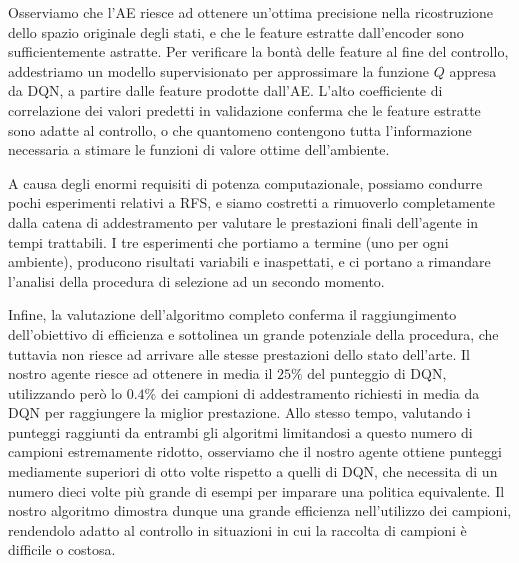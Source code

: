 Osserviamo che l'AE riesce ad ottenere un'ottima precisione nella ricostruzione 
dello spazio originale degli stati, e che le feature estratte dall'encoder 
sono sufficientemente astratte.
Per verificare la bont\`a delle feature al fine del controllo, addestriamo un 
modello supervisionato per approssimare la funzione $Q$ appresa da DQN, a 
partire dalle feature prodotte dall'AE. 
L'alto coefficiente di correlazione dei valori predetti in validazione conferma 
che le feature estratte sono adatte al controllo, o che quantomeno contengono 
tutta l'informazione necessaria a stimare le funzioni di valore ottime 
dell'ambiente. 

A causa degli enormi requisiti di potenza computazionale, possiamo 
condurre pochi esperimenti relativi a RFS, e siamo costretti a rimuoverlo 
completamente dalla catena di addestramento per valutare le prestazioni
finali dell'agente in tempi trattabili. 
I tre esperimenti che portiamo a termine (uno per ogni ambiente), producono 
risultati variabili e inaspettati, e ci portano a rimandare l'analisi della
procedura di selezione ad un secondo momento. 

Infine, la valutazione dell'algoritmo completo conferma il raggiungimento 
dell'obiettivo di efficienza e sottolinea un grande potenziale della procedura,
che tuttavia non riesce ad arrivare alle stesse prestazioni dello stato 
dell'arte.
Il nostro agente riesce ad ottenere in media il $25\%$ del punteggio di DQN, 
utilizzando per\`o lo $0.4\%$ dei campioni di addestramento richiesti in media
da DQN per raggiungere la miglior prestazione. 
Allo stesso tempo, valutando i punteggi raggiunti da entrambi gli algoritmi 
limitandosi a questo numero di campioni estremamente ridotto, osserviamo che
il nostro agente ottiene punteggi mediamente superiori di otto volte rispetto a 
quelli di DQN, che necessita di un numero dieci volte pi\`u grande di esempi 
per imparare una politica equivalente.
Il nostro algoritmo dimostra dunque una grande efficienza nell'utilizzo dei 
campioni, rendendolo adatto al controllo in situazioni in cui la raccolta
di campioni \`e difficile o costosa. 


































